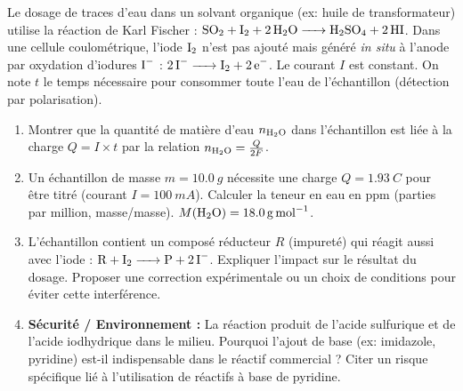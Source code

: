 \documentclass[11pt]{article}
\begin{document}
\begin{exercice}
Le dosage de traces d'eau dans un solvant organique (ex: huile de transformateur) utilise la réaction de Karl Fischer : $\ce{SO2 + I2 + 2 H2O -> H2SO4 + 2 HI}$. Dans une cellule coulométrique, l'iode $\ce{I2}$ n'est pas ajouté mais généré \textit{in situ} à l'anode par oxydation d'iodures $\ce{I-}$ : $\ce{2 I- -> I2 + 2 e-}$. Le courant $I$ est constant. On note $t$ le temps nécessaire pour consommer toute l'eau de l'échantillon (détection par polarisation).
\begin{enumerate}
    \item Montrer que la quantité de matière d'eau $n_{\ce{H2O}}$ dans l'échantillon est liée à la charge $Q = I \times t$ par la relation $n_{\ce{H2O}} = \frac{Q}{2F}$.
    \item Un échantillon de masse $m = \SI{10,0}{g}$ nécessite une charge $Q = \SI{1,93}{C}$ pour être titré (courant $I=\SI{100}{mA}$). Calculer la teneur en eau en ppm (parties par million, masse/masse). $M(\ce{H2O})=\SI{18,0}{g.mol^{-1}}$.
    \item L'échantillon contient un composé réducteur $R$ (impureté) qui réagit aussi avec l'iode : $\ce{R + I2 -> P + 2 I-}$. Expliquer l'impact sur le résultat du dosage. Proposer une correction expérimentale ou un choix de conditions pour éviter cette interférence.
    \item \textbf{Sécurité / Environnement :} La réaction produit de l'acide sulfurique et de l'acide iodhydrique dans le milieu. Pourquoi l'ajout de base (ex: imidazole, pyridine) est-il indispensable dans le réactif commercial ? Citer un risque spécifique lié à l'utilisation de réactifs à base de pyridine.
\end{enumerate}
\end{exercice}
\end{document}

